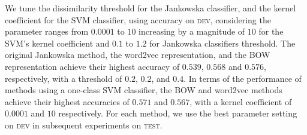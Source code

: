 \documentclass[11pt]{article}
\newcommand\dev{\textsc{dev}\xspace}
\newcommand\test{\textsc{test}\xspace}
\begin{document}
We tune the dissimilarity threshold for the Jankowska classifier, and
the kernel coefficient for the SVM classifier, using accuracy on \dev,
considering the parameter ranges from $0.0001$ to $10$ increasing by a magnitude of $10$ for the SVM's kernel coefficient and $0.1$ to $1.2$ for Jankowska classifiers threshold. The original Jankowska method, the word2vec
representation, and the BOW representation achieve their highest accuracy of $0.539$, $0.568$ and $0.576$,
respectively, with a threshold of $0.2$, $0.2$, and $0.4$. In terms of the performance
of methods using a one-class SVM classifier, the BOW and word2vec methods
achieve their highest accuracies of $0.571$ and $0.567$, with
a kernel coefficient of $0.0001$ and $10$ respectively. For
each method, we use the best parameter setting on \dev in subsequent
experiments on \test. 


\end{document}
